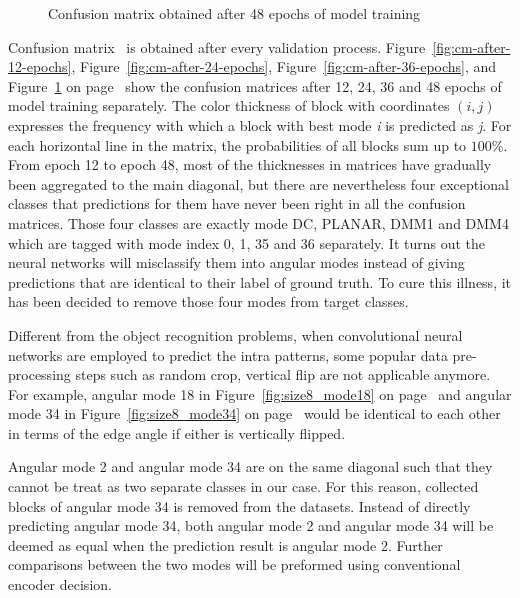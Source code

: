 \begin{figure}
\begin{minipage}{0.49\textwidth}
        \caption[Confusion matrix obtained after 48 epochs of model training]
        {Confusion matrix obtained after 48 epochs of model training}
        \label{fig:cm-after-48-epochs}
    \end{minipage}
\end{figure}
Confusion matrix~\parencite{RN216} is obtained after 
every validation process.
Figure~\ref{fig:cm-after-12-epochs},
Figure~\ref{fig:cm-after-24-epochs},
Figure~\ref{fig:cm-after-36-epochs}, and
Figure~\ref{fig:cm-after-48-epochs}
on page~\pageref{fig:cm-after-12-epochs}
show the confusion matrices
after 12, 24, 36 and 48 epochs of model training
separately.
The color thickness of block with coordinates $(i,j)$
expresses the frequency with which a block with best 
mode \emph{i} is predicted as \emph{j}.
For each horizontal line in the matrix, 
the probabilities of all blocks sum up to $100\%$.
From epoch 12 to epoch 48, most of the thicknesses 
in matrices have gradually been aggregated to 
the main diagonal, but there are nevertheless
four exceptional classes that predictions for them
have never been right in all the confusion matrices.
Those four classes are exactly mode DC, PLANAR, 
DMM1 and DMM4 which are tagged with mode index 
0, 1, 35 and 36 separately.
It turns out the neural networks will misclassify 
them into angular modes instead of giving 
predictions that are identical to their label 
of ground truth.
To cure this illness, it has been decided to
remove those four modes from target classes.

Different from the object recognition problems,
when convolutional neural networks are employed to 
predict the intra patterns, some popular data pre-processing
steps such as random crop, vertical flip
are not applicable anymore.
For example, angular mode 18 in Figure~\ref{fig:size8_mode18}
on page~\pageref{fig:size8_mode18} and angular mode 34 in
Figure~\ref{fig:size8_mode34} on page~\pageref{fig:size8_mode34}
would be identical to each other in terms of the edge angle
if either is vertically flipped.

Angular mode 2 and angular mode 34 are
on the same diagonal such that they cannot 
be treat as two separate classes in our case.
For this reason, collected blocks of angular mode 34
is removed from the datasets.
Instead of directly predicting angular mode 34,
both angular mode 2 and angular mode 34 will
be deemed as equal
when the prediction result is angular mode 2.
Further comparisons between the two modes will
be preformed using conventional encoder decision.

